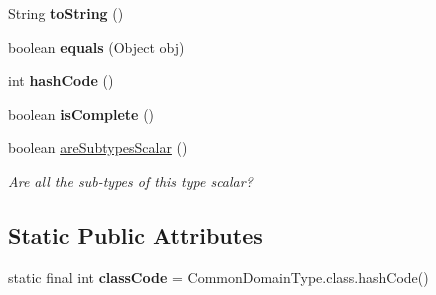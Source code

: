 \begin{DoxyCompactItemize}
\item 
\hypertarget{classedu_1_1udel_1_1cis_1_1vsl_1_1civl_1_1model_1_1common_1_1type_1_1CommonDomainType_a1cf1e0295597b805d33f770ff78a039e}{}String {\bfseries to\+String} ()\label{classedu_1_1udel_1_1cis_1_1vsl_1_1civl_1_1model_1_1common_1_1type_1_1CommonDomainType_a1cf1e0295597b805d33f770ff78a039e}

\item 
\hypertarget{classedu_1_1udel_1_1cis_1_1vsl_1_1civl_1_1model_1_1common_1_1type_1_1CommonDomainType_ae8e4b98f7c7c8ac4572b1d8b0a206389}{}boolean {\bfseries equals} (Object obj)\label{classedu_1_1udel_1_1cis_1_1vsl_1_1civl_1_1model_1_1common_1_1type_1_1CommonDomainType_ae8e4b98f7c7c8ac4572b1d8b0a206389}

\item 
\hypertarget{classedu_1_1udel_1_1cis_1_1vsl_1_1civl_1_1model_1_1common_1_1type_1_1CommonDomainType_ac9215c208d502b426f7cd9f8f382bc9a}{}int {\bfseries hash\+Code} ()\label{classedu_1_1udel_1_1cis_1_1vsl_1_1civl_1_1model_1_1common_1_1type_1_1CommonDomainType_ac9215c208d502b426f7cd9f8f382bc9a}

\item 
\hypertarget{classedu_1_1udel_1_1cis_1_1vsl_1_1civl_1_1model_1_1common_1_1type_1_1CommonDomainType_a76d553727ddeba44eec69200c545a752}{}boolean {\bfseries is\+Complete} ()\label{classedu_1_1udel_1_1cis_1_1vsl_1_1civl_1_1model_1_1common_1_1type_1_1CommonDomainType_a76d553727ddeba44eec69200c545a752}

\item 
boolean \hyperlink{classedu_1_1udel_1_1cis_1_1vsl_1_1civl_1_1model_1_1common_1_1type_1_1CommonDomainType_a5cb6a2baec5b5f86a379c240793d6769}{are\+Subtypes\+Scalar} ()
\begin{DoxyCompactList}\small\item\em Are all the sub-\/types of this type scalar? \end{DoxyCompactList}\end{DoxyCompactItemize}
\subsection*{Static Public Attributes}
\begin{DoxyCompactItemize}
\item 
\hypertarget{classedu_1_1udel_1_1cis_1_1vsl_1_1civl_1_1model_1_1common_1_1type_1_1CommonDomainType_a097c9d27746d946563c0f3f599584234}{}static final int {\bfseries class\+Code} = Common\+Domain\+Type.\+class.\+hash\+Code()\label{classedu_1_1udel_1_1cis_1_1vsl_1_1civl_1_1model_1_1common_1_1type_1_1CommonDomainType_a097c9d27746d946563c0f3f599584234}

\end{DoxyCompactItemize}
